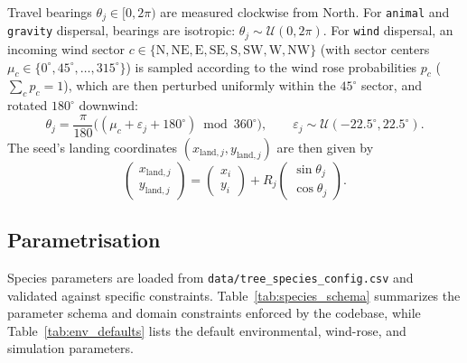 \documentclass[a4paper,11pt]{scrartcl}
\begin{document}
Travel bearings $\theta_j \in [0, 2\pi)$ are measured clockwise from North. For \texttt{animal} and \texttt{gravity} dispersal, bearings are isotropic: $\theta_j \sim \mathcal{U}(0, 2\pi)$. For \texttt{wind} dispersal, an incoming wind sector $c \in \{\text{N}, \text{NE}, \text{E}, \text{SE}, \text{S}, \text{SW}, \text{W}, \text{NW}\}$ (with sector centers $\mu_c \in \{0^\circ, 45^\circ, \dots, 315^\circ\}$) is sampled according to the wind rose probabilities $p_c$ ($\sum_c p_c = 1$), which are then perturbed uniformly within the $45^\circ$ sector, and rotated $180^\circ$ downwind:
\begin{equation}
\label{eq:wind_bearing}
\theta_j = \frac{\pi}{180} \Big( (\mu_c + \varepsilon_j + 180^\circ) \bmod 360^\circ \Big), \qquad \varepsilon_j \sim \mathcal{U}(-22.5^\circ, 22.5^\circ).
\end{equation}
The seed's landing coordinates $(x_{\text{land}, j}, y_{\text{land}, j})$ are then given by
\begin{equation}
\label{eq:landing_coords}
\begin{pmatrix} x_{\text{land}, j} \\ y_{\text{land}, j} \end{pmatrix}
=
\begin{pmatrix} x_i \\ y_i \end{pmatrix}
+ R_j
\begin{pmatrix} \sin \theta_j \\ \cos \theta_j \end{pmatrix}.
\end{equation}


\subsection{Parametrisation}
\label{sec:parametrisation}

Species parameters are loaded from \texttt{data/tree\_species\_config.csv} and validated against specific constraints. Table~\ref{tab:species_schema} summarizes the parameter schema and domain constraints enforced by the codebase, while Table~\ref{tab:env_defaults} lists the default environmental, wind-rose, and simulation parameters.
\end{document}
